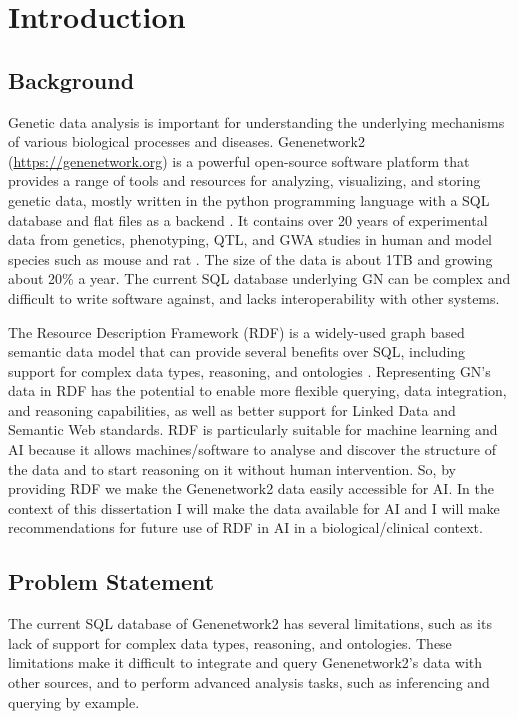\chapter{Introduction}

\section{Background}
Genetic data analysis is important for understanding the underlying mechanisms of various biological processes and diseases.  Genenetwork2 (\url{https://genenetwork.org}) is a powerful open-source software platform that provides a range of tools and resources for analyzing, visualizing, and storing genetic data, mostly written in the python programming language with a SQL database and flat files as a backend \citep{sloan2016genenetwork,mulligan2017genenetwork}.  It contains over 20 years of experimental data from genetics, phenotyping, QTL, and GWA studies in human and model species such as mouse and rat \citep{sloan2016genenetwork}.  The size of the data is about 1TB and growing about 20\% a year. The current SQL database underlying GN can be complex and difficult to write software against, and lacks interoperability with other systems.

The Resource Description Framework (RDF) is a widely-used graph based semantic data model that can provide several benefits over SQL, including support for complex data types, reasoning, and ontologies \citep{candan2001resource}.  Representing GN's data in RDF has the potential to enable more flexible querying, data integration, and reasoning capabilities, as well as better support for Linked Data and Semantic Web standards. RDF is particularly suitable for machine learning and AI because it allows machines/software to analyse and discover the structure of the data and to start reasoning on it without human intervention. So, by providing RDF we make the Genenetwork2 data easily accessible for AI. In the context of this dissertation I will make the data available for AI and I will make recommendations for future use of RDF in AI in a biological/clinical context.

\section{Problem Statement}

The current SQL database of Genenetwork2 has several limitations, such as its lack of support for complex data types, reasoning, and ontologies.  These limitations make it difficult to integrate and query Genenetwork2's data with other sources, and to perform advanced analysis tasks, such as inferencing and querying by example.

